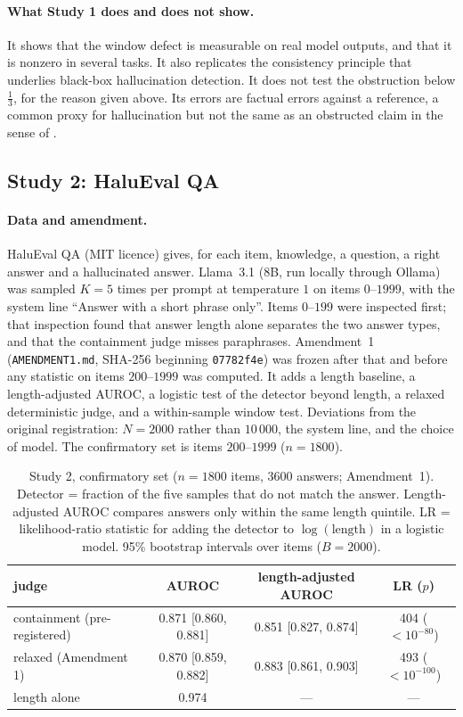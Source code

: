 \documentclass[11pt]{article}
\theoremstyle{definition}
\begin{document}
\paragraph{What Study 1 does and does not show.} It shows that the window defect is measurable on real model outputs, and that it is
nonzero in several tasks. It also replicates the consistency principle that underlies black-box hallucination detection. It does not
test the obstruction below $\tfrac13$, for the reason given above. Its errors are factual errors against a reference, a common proxy for
hallucination \cite{Ji2023} but not the same as an obstructed claim in the sense of \cite[\S10.5]{Tower}.

\subsection{Study 2: HaluEval QA}
\paragraph{Data and amendment.} HaluEval QA \cite{Li2023HaluEval} (MIT licence) gives, for each item, knowledge, a question, a right
answer and a hallucinated answer. Llama~3.1 (8B, run locally through Ollama) was sampled $K=5$ times per prompt at temperature $1$
on items $0$--$1999$, with the system line ``Answer with a short phrase only''. Items $0$--$199$ were inspected first; that inspection
found that answer length alone separates the two answer types, and that the containment judge misses paraphrases. Amendment~1
(\texttt{AMENDMENT1.md}, SHA-256 beginning \texttt{07782f4e}) was frozen after that and before any statistic on items $200$--$1999$
was computed. It adds a length baseline, a length-adjusted AUROC, a logistic test of the detector beyond length, a relaxed
deterministic judge, and a within-sample window test. Deviations from the original registration: $N=2000$ rather than $10\,000$, the
system line, and the choice of model. The confirmatory set is items $200$--$1999$ ($n=1800$).

\begin{table}[!htbp]\centering\small
\caption{Study 2, confirmatory set ($n=1800$ items, $3600$ answers; Amendment~1). Detector = fraction of the five samples that do not
match the answer. Length-adjusted AUROC compares answers only within the same length quintile. LR = likelihood-ratio statistic for
adding the detector to $\log(\text{length})$ in a logistic model. 95\% bootstrap intervals over items ($B=2000$).}
\label{tab:study2}
\begin{tabular}{lccc}\toprule
judge & AUROC & length-adjusted AUROC & LR ($p$)\\\midrule
containment (pre-registered) & 0.871 [0.860, 0.881] & 0.851 [0.827, 0.874] & 404 ($<10^{-80}$)\\
relaxed (Amendment 1)        & 0.870 [0.859, 0.882] & 0.883 [0.861, 0.903] & 493 ($<10^{-100}$)\\\midrule
length alone                 & 0.974 & --- & ---\\\bottomrule
\end{tabular}
\end{table}
\end{document}
